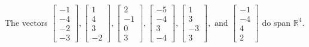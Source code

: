 \begin{exercise}
\begin{exerciseStatement}
  \end{exerciseStatement}
  \begin{exerciseAnswer}
   The vectors \(\left[\begin{array}{r}
-1 \\
-4 \\
-2 \\
-3
\end{array}\right] , \left[\begin{array}{r}
1 \\
4 \\
3 \\
-2
\end{array}\right] , \left[\begin{array}{r}
2 \\
-1 \\
0 \\
3
\end{array}\right] , \left[\begin{array}{r}
-5 \\
-4 \\
3 \\
-4
\end{array}\right] , \left[\begin{array}{r}
1 \\
3 \\
-3 \\
3
\end{array}\right] , \text{ and } \left[\begin{array}{r}
-1 \\
-4 \\
4 \\
2
\end{array}\right]\) 
  	 do  
	span \(\mathbb{R}^4\).
  


  \end{exerciseAnswer}
\end{exercise}